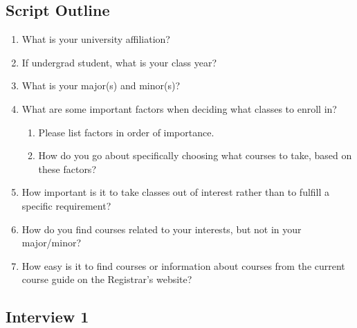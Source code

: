 \documentclass[12pt]{report}
\begin{document}
\subsection{Script Outline}

\begin{enumerate}
\item What is your university affiliation?
\item If undergrad student, what is your class year?
\item What is your major(s) and minor(s)?
\item What are some important factors when deciding what classes to enroll in?
	\begin{enumerate}
    \item Please list factors in order of importance.
    \item How do you go about specifically choosing what courses to take, based on these factors?
    \end{enumerate}
\item How important is it to take classes out of interest rather than to fulfill a specific requirement?
\item How do you find courses related to your interests, but not in your major/minor?
\item How easy is it to find courses or information about courses from the current course guide on the Registrar's website?
\end{enumerate}

\subsection{Interview 1}
\end{document}
